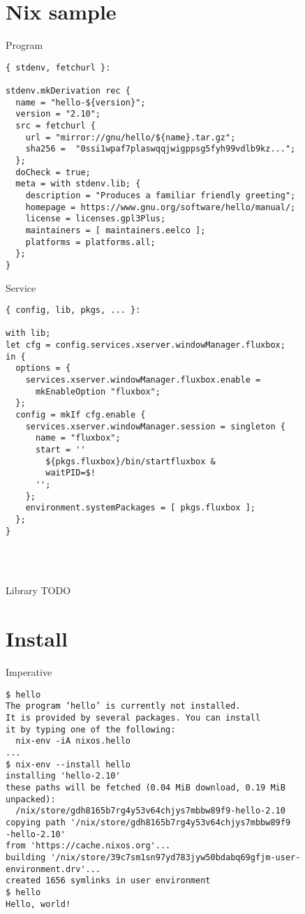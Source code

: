 \documentclass[smaller]{beamer}
\begin{document}
\section{Nix sample}
\label{sec:orgcd7a9c8}
\begin{block}{Program}
\begin{verbatim}
{ stdenv, fetchurl }:

stdenv.mkDerivation rec {
  name = "hello-${version}";
  version = "2.10";
  src = fetchurl {
    url = "mirror://gnu/hello/${name}.tar.gz";
    sha256 =  "0ssi1wpaf7plaswqqjwigppsg5fyh99vdlb9kz...";
  };
  doCheck = true;
  meta = with stdenv.lib; {
    description = "Produces a familiar friendly greeting";
    homepage = https://www.gnu.org/software/hello/manual/;
    license = licenses.gpl3Plus;
    maintainers = [ maintainers.eelco ];
    platforms = platforms.all;
  };
}
\end{verbatim}
\end{block}

\begin{block}{Service}
\begin{verbatim}
{ config, lib, pkgs, ... }:

with lib;
let cfg = config.services.xserver.windowManager.fluxbox;
in {
  options = {
    services.xserver.windowManager.fluxbox.enable =
      mkEnableOption "fluxbox";
  };
  config = mkIf cfg.enable {
    services.xserver.windowManager.session = singleton {
      name = "fluxbox";
      start = ''
        ${pkgs.fluxbox}/bin/startfluxbox &
        waitPID=$!
      '';
    };
    environment.systemPackages = [ pkgs.fluxbox ];
  };
}
\end{verbatim}

\hfill\\
\hfill\\
\end{block}

\begin{block}{Library}
TODO\\
\end{block}

\section{Install}
\label{sec:org7afc341}

\begin{block}{Imperative}
\begin{verbatim}
$ hello
The program ‘hello’ is currently not installed.
It is provided by several packages. You can install
it by typing one of the following:
  nix-env -iA nixos.hello
...
$ nix-env --install hello
installing 'hello-2.10'
these paths will be fetched (0.04 MiB download, 0.19 MiB
unpacked):
  /nix/store/gdh8165b7rg4y53v64chjys7mbbw89f9-hello-2.10
copying path '/nix/store/gdh8165b7rg4y53v64chjys7mbbw89f9
-hello-2.10'
from 'https://cache.nixos.org'...
building '/nix/store/39c7sm1sn97yd783jyw50bdabq69gfjm-user-
environment.drv'...
created 1656 symlinks in user environment
$ hello
Hello, world!
\end{verbatim}
\end{block}
\end{document}
